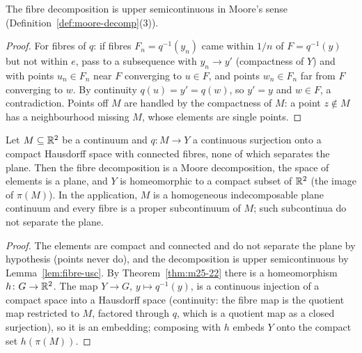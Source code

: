 \begin{lemma}\label{lem:fibre-usc}
The fibre decomposition is upper semicontinuous in Moore's sense (Definition~\ref{def:moore-decomp}(3)).
\end{lemma}

\begin{proof}
For fibres of $q$: if fibres $F_n=q^{-1}(y_n)$ came within $1/n$ of $F=q^{-1}(y)$ but not within $e$, pass to a
subsequence with $y_n\to y'$ (compactness of $Y$) and with points $u_n\in F_n$ near $F$ converging to $u\in F$,
and points $w_n\in F_n$ far from $F$ converging to $w$. By continuity $q(u)=y'=q(w)$, so $y'=y$ and $w\in F$,
a contradiction. Points off $M$ are handled by the compactness of $M$: a point $z\notin M$ has a neighbourhood missing $M$,
whose elements are single points.
\end{proof}


\begin{corollary}\label{cor:monotone-plane}
Let $M\subseteq\mathbb{R}^2$ be a continuum and $q\colon M\to Y$ a continuous surjection onto a compact Hausdorff space with
connected fibres, none of which separates the plane. Then the fibre decomposition is a Moore decomposition, the
space of elements is a plane, and $Y$ is homeomorphic to a compact subset of $\mathbb{R}^2$ (the image of $\pi(M)$).
In the application, $M$ is a homogeneous indecomposable plane continuum and every fibre is a proper subcontinuum of
$M$; such subcontinua do not separate the plane.
\end{corollary}

\begin{proof}
The elements are compact and connected and do not separate the plane by hypothesis (points never do), and the
decomposition is upper semicontinuous by Lemma~\ref{lem:fibre-usc}. By Theorem~\ref{thm:m25-22} there is a
homeomorphism $h\colon G\to\mathbb{R}^2$. The map $Y\to G$, $y\mapsto q^{-1}(y)$, is a continuous injection of a compact space
into a Hausdorff space (continuity: the fibre map is the quotient map restricted to $M$, factored through $q$, which is a
quotient map as a closed surjection), so it is an embedding; composing with $h$ embeds $Y$ onto the compact set
$h(\pi(M))$.
\end{proof}


